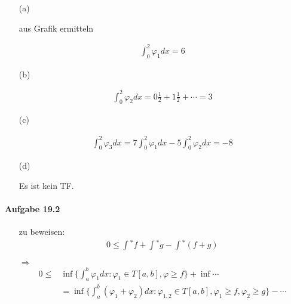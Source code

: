 \documentclass[11pt,a4paper]{article}
\begin{document}
\begin{enumerate}

\item[(a)]

aus Grafik ermitteln

\begin{align*}
\int_0^2\varphi_1dx=6
\end{align*}

\end{enumerate}

\begin{enumerate}

\item[(b)]

\begin{align*}
\int_0^2\varphi_2dx=0\frac{1}{2}+1\frac{1}{2}+\cdots=3
\end{align*}

\end{enumerate}

\begin{enumerate}

\item[(c)]

\begin{align*}
\int_0^2\varphi_3dx=7\int_0^2\varphi_1dx-5\int_0^2\varphi_2dx=-8
\end{align*}

\end{enumerate}

\begin{enumerate}

\item[(d)]

Es ist kein TF.

\end{enumerate}

\newpage

\paragraph{Aufgabe 19.2}

\begin{enumerate}

\item[ ]

zu beweisen:
\begin{align*}
0\leq\int{}^*f+\int{}^*g-\int{}^*(f+g)
\end{align*}

$\Rightarrow$
\begin{align*}
0\leq & \inf\{\int_a^b\varphi_1dx:\varphi_1\in T[a,b],\varphi\geq f\}+\inf\cdots \\
&=
\inf\{\int_a^b(\varphi_1+\varphi_2)dx:\varphi_{1,2}\in T[a,b],\varphi_1\geq f,\varphi_2\geq g\}-\cdots	
\end{align*}

\end{enumerate}
\end{document}
